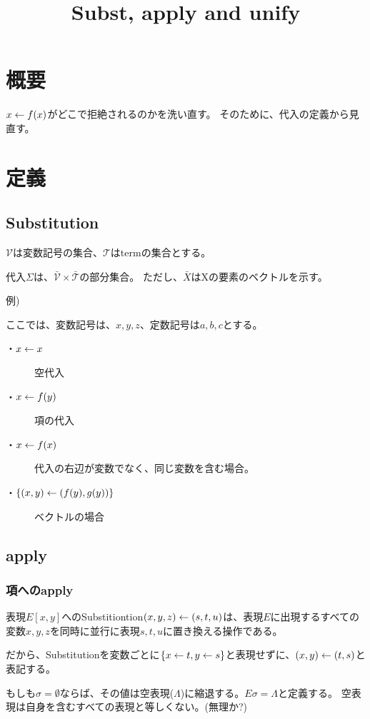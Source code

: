 \documentclass[10pt, oneside]{jarticle}   	%
\title{Subst, apply and unify}
\author{\myname}
\begin{document}
\maketitle

%


\section{概要}
$x \leftarrow f(x)$がどこで拒絶されるのかを洗い直す。
そのために、代入の定義から見直す。

\section{定義}
\subsection{Substitution}
$\mathcal{V}$は変数記号の集合、$\mathcal{T}$はtermの集合とする。

代入$\mathcal{Σ}$は、$\mathcal{\bar{V}}\times\mathcal{\bar{T}}$の部分集合。
ただし、$\bar{X}$はXの要素のベクトルを示す。

例)

ここでは、変数記号は、$x,y,z$、定数記号は$a,b,c$とする。

\begin{description}
\item[・$x \leftarrow x $]  空代入
\item[・$x \leftarrow f(y)$] 項の代入
\item[・$x \leftarrow f(x)$] 代入の右辺が変数でなく、同じ変数を含む場合。
\item[・$\{(x,y) \leftarrow (f(y),g(y))\}$] ベクトルの場合
\end{description}

\subsection{apply}
\subsubsection{項へのapply}
表現$E[x,y]$へのSubstitiontion$(x,y,z) \leftarrow (s,t,u)$は、表現$E$に出現するすべての変数$x,y,z$を同時に並行に表現$s,t,u$に置き換える操作である。

だから、Substitutionを変数ごとに$\{{x \leftarrow t,y \leftarrow s}\}$と表現せずに、$(x,y) \leftarrow (t,s)$と表記する。

もしも$\sigma=\emptyset$ならば、その値は空表現($\varLambda$)に縮退する。$E\sigma = \varLambda$と定義する。
空表現は自身を含むすべての表現と等しくない。(無理か?)
\end{document}
